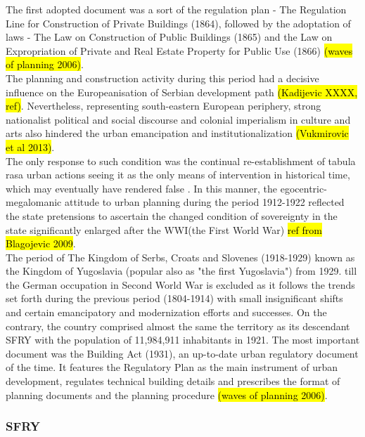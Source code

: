 \documentclass[11pt]{report}
\begin{document}
The first adopted document was a sort of the regulation plan - The Regulation  Line  for  Construction  of  Private  Buildings (1864), followed by the adoptation of laws - The Law on Construction of Public Buildings (1865) and the Law on Expropriation of Private and Real Estate Property for Public Use (1866) \hl{(waves of planning 2006)}.
\\
The planning and construction activity during this period had a decisive influence on the Europeanisation of Serbian development path \hl{(Kadijevic XXXX, ref)}. Nevertheless, representing south-eastern European periphery, strong nationalist political and social discourse and colonial imperialism in culture and arts also hindered the urban emancipation and institutionalization \hl{(Vukmirovic et al 2013)}.
\\
The only response to such condition was the continual re-establishment of tabula rasa urban actions seeing it as the only means of intervention in historical time, which may eventually have rendered false \cite{Blagojevic 2009}. In this manner, the egocentric-megalomanic attitude to urban planning during the period 1912-1922 reflected the state pretensions to ascertain the changed condition of sovereignty in the state significantly enlarged after the WWI(the First World War) \hl{ref from Blagojevic 2009}.
\\
The period of The Kingdom of Serbs, Croats and Slovenes (1918-1929) known as the Kingdom of Yugoslavia (popular also as "the first Yugoslavia") from 1929. till the German occupation in Second World War is excluded as it follows the trends set forth during the previous period (1804-1914) with small insignificant shifts and  certain emancipatory and modernization efforts and successes. On the contrary, the country comprised almost the same the territory as its descendant SFRY with the population of 11,984,911 inhabitants in 1921. The most important document was the Building Act (1931), an up-to-date urban regulatory document of the time. It features the Regulatory Plan as the main instrument of urban development, regulates technical building details and prescribes the format of planning documents and the planning procedure \hl{(waves of planning 2006)}.

\subsubsection{SFRY}
\end{document}
